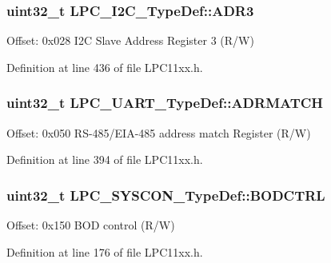 \subsubsection[{\texorpdfstring{A\+D\+R3}{ADR3}}]{ uint32\+\_\+t L\+P\+C\+\_\+\+I2\+C\+\_\+\+Type\+Def\+::\+A\+D\+R3}\hypertarget{group___l_p_c11xx___definitions_ga8b1d9441dc204cc08796931c332d2259}{}\label{group___l_p_c11xx___definitions_ga8b1d9441dc204cc08796931c332d2259}
Offset\+: 0x028 I2C Slave Address Register 3 (R/W) 

Definition at line 436 of file L\+P\+C11xx.\+h.

\subsubsection[{\texorpdfstring{A\+D\+R\+M\+A\+T\+CH}{ADRMATCH}}]{ uint32\+\_\+t L\+P\+C\+\_\+\+U\+A\+R\+T\+\_\+\+Type\+Def\+::\+A\+D\+R\+M\+A\+T\+CH}\hypertarget{group___l_p_c11xx___definitions_gaf2171616d6659b7f82a217b465ba0e3d}{}\label{group___l_p_c11xx___definitions_gaf2171616d6659b7f82a217b465ba0e3d}
Offset\+: 0x050 R\+S-\/485/\+E\+I\+A-\/485 address match Register (R/W) 

Definition at line 394 of file L\+P\+C11xx.\+h.

\subsubsection[{\texorpdfstring{B\+O\+D\+C\+T\+RL}{BODCTRL}}]{ uint32\+\_\+t L\+P\+C\+\_\+\+S\+Y\+S\+C\+O\+N\+\_\+\+Type\+Def\+::\+B\+O\+D\+C\+T\+RL}\hypertarget{group___l_p_c11xx___definitions_ga6c18e909c190b4b0819a72c6cc346661}{}\label{group___l_p_c11xx___definitions_ga6c18e909c190b4b0819a72c6cc346661}
Offset\+: 0x150 B\+OD control (R/W) 

Definition at line 176 of file L\+P\+C11xx.\+h.

